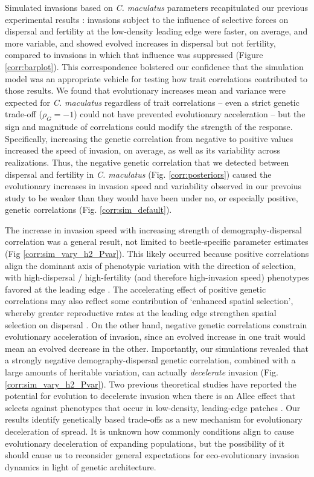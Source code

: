 \documentclass[11pt]{article}
\begin{document}
Simulated invasions based on \textit{C. maculatus} parameters recapitulated our previous experimental results \citep{ochocki_rapid_2017}: invasions subject to the influence of selective forces on dispersal and fertility at the low-density leading edge were faster, on average, and more variable, and showed evolved increases in dispersal but not fertility, compared to invasions in which that influence was suppressed (Figure \ref{corr:barplot}).
This correspondence bolstered our confidence that the simulation model was an appropriate vehicle for testing how trait correlations contributed to those results.
We found that evolutionary increases mean and variance were expected for \textit{C. maculatus} regardless of trait correlations -- even a strict genetic trade-off ($\rho_{G} = -1$) could not have prevented evolutionary acceleration -- but the sign and magnitude of correlations could modify the strength of the response.
Specifically, increasing the genetic correlation from negative to positive values increased the speed of invasion, on average, as well as its variability across realizations.
Thus, the negative genetic correlation that we detected between dispersal and fertility in \textit{C. maculatus} (Fig. \ref{corr:posteriors}) caused the evolutionary increases in invasion speed and variability observed in our prevoius study to be weaker than they would have been under no, or especially positive, genetic correlations (Fig. \ref{corr:sim_default}).

The increase in invasion speed with increasing strength of demography-dispersal correlation was a general result, not limited to beetle-specific parameter estimates (Fig \ref{corr:sim_vary_h2_Pvar}).
This likely occurred because positive correlations align the dominant axis of phenotypic variation with the direction of selection, with high-dispersal / high-fertility (and therefore high-invasion speed) phenotypes favored at the leading edge \citep{phillips_life-history_2010}.
The accelerating effect of positive genetic correlations may also reflect some contribution of `enhanced spatial selection', whereby greater reproductive rates at the leading edge strengthen spatial selection on dispersal \citep{perkins_evolution_2013}.
On the other hand, negative genetic correlations constrain evolutionary acceleration of invasion, since an evolved increase in one trait would mean an evolved decrease in the other.
Importantly, our simulations revealed that a strongly negative demography-dispersal genetic correlation, combined with a large amounts of heritable variation, can actually \textit{decelerate} invasion (Fig. \ref{corr:sim_vary_h2_Pvar}).
Two previous theoretical studies have reported the potential for evolution to decelerate invasion when there is an Allee effect that selects against phenotypes that occur in low-density, leading-edge patches \citep{shaw_dispersal_2015, travis_dispersal_2002}.
Our results identify genetically based trade-offs as a new mechanism for evolutionary deceleration of spread.
It is unknown how commonly conditions align to cause evolutionary deceleration of expanding populations, but the possibility of it should cause us to reconsider general expectations for eco-evolutionary invasion dynamics in light of genetic architecture.
\end{document}
